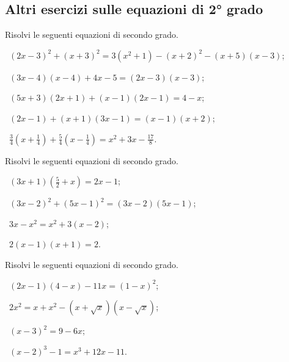 \subsection*{Altri esercizi sulle equazioni di 2° grado}

\begin{esercizio}[\Ast]
\label{ese:3.17} %
Risolvi le seguenti equazioni di secondo grado.
 \begin{enumeratea}
 \item~$(2 x -3)^{2}+(x+3)^{2}=3\left(x^{2} + 1 \right)-(x+2)^{2}-(x+5)(x-3)$;
 \item~$(3 x-4)(x-4) + 4x-5 = (2 x-3) (x-3)$;
 \item~$(5 x+3)(2x+1) +(x-1)(2x-1) = 4-x$;
 \item~$(2x-1)+(x+1)(3x-1) = (x-1)(x+2)$;
 \item~$\frac{3}{4}\left(x+\frac{1}{4}\right)+\frac{5}{4}\left(x-\frac{1}{4}\right)=x^{2}+3x-\frac{17}{8}$.
 \end{enumeratea}
\end{esercizio}
\pagebreak
\begin{esercizio}[\Ast]
\label{ese:3.18}
Risolvi le seguenti equazioni di secondo grado.
\begin{multicols}{2}
 \begin{enumeratea}
 \item~$(3 x + 1) \left(\frac{5}{2} + x \right) = 2 x-1$;
 \item~$(3 x-2)^{2} + (5 x-1)^{2} = (3 x-2) (5 x-1)$;
 \item~$3 x-x^{2} = x^{2} + 3 (x-2)$;
 \item~$2 (x-1) (x + 1) = 2$.
 \end{enumeratea}
 \end{multicols}
\end{esercizio}

\begin{esercizio}[\Ast]
 \label{ese:3.19}
Risolvi le seguenti equazioni di secondo grado.
\begin{multicols}{2}
 \begin{enumeratea}
 \item~$(2 x-1) (4-x)-11 x = (1-x)^{2}$;
 \item~$2x^{2} = x + x^{2}-(x + \sqrt{x}) (x-\sqrt{x})$;
 \item~$(x-3)^{2} = 9-6 x$;
 \item~$(x-2)^{3}-1 = x^{3} + 12 x-11$.
 \end{enumeratea}
 \end{multicols}
\end{esercizio}

